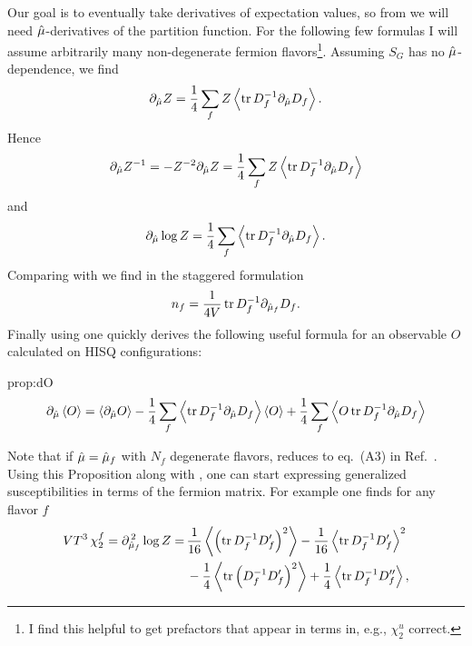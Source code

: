 Our goal is to eventually take derivatives of expectation values, so from
 we will need $\hat{\mu}$-derivatives of the partition 
function. For the following few formulas 
I will assume arbitrarily many non-degenerate
fermion flavors\footnote{I find this helpful to get prefactors that appear
in terms in, e.g., $\chi_2^u$ correct.}. Assuming $S_G$ has no 
$\hat{\mu}$-dependence, we find
\begin{equation}
  \partial_{\muh}Z = \frac{1}{4}\sum_f 
                      Z\ev{\tr D_f^{-1}\partial_{\muh}D_f}.
\end{equation}
Hence 
\begin{equation}\label{eq:dZinv}
  \partial_{\muh}Z^{-1} = -Z^{-2}\partial_{\muh}Z
                        =\frac{1}{4}\sum_fZ\ev{\tr D_f^{-1}\partial_{\muh}D_f}
\end{equation}
and
\begin{equation}\label{eq:dlogZ}
  \partial_{\muh}\log Z=\frac{1}{4}\sum_f\ev{\tr D_f^{-1}\partial_{\muh}D_f}.
\end{equation}
Comparing  with  we find in
the staggered formulation
\begin{equation}
  n_f=\frac{1}{4V}\tr D_f^{-1}\partial_{\hat{\mu}_f}D_f.
\end{equation} 
Finally using  one quickly derives the following useful formula
for an observable $O$ calculated on HISQ configurations:
\begin{proposition}{}{prop:dO}
\begin{equation*} \partial_{\muh}\ev{O}
       =   \ev{\partial_{\muh}O}
        -\frac{1}{4}\sum_f\ev{\tr D_f^{-1}\partial_{\muh}D_f}\ev{O}
         +\frac{1}{4}\sum_f\ev{O\tr D_f^{-1}\partial_{\muh}D_f}
\end{equation*}
\end{proposition} 
Note that if $\hat{\mu}=\hat{\mu}_f$ with $N_f$ degenerate flavors, 
 reduces to eq.~(A3)
in Ref.~\cite{allton_thermodynamics_2005}. Using this Proposition along
with , one 
can start expressing generalized susceptibilities in terms of the fermion
matrix. For example one finds for any flavor $f$
\begin{equation}\begin{aligned}
  VT^3\,\chi_2^f =\partial_{\muh_f}^{\,2}\log Z
                 =\, & \frac{1}{16}\ev{\left(\tr D_f^{-1}D_f'\right)^2}
                    -\frac{1}{16}\ev{\tr D_f^{-1}D_f'}^2\\
                   & -\frac{1}{4}\ev{\tr \left(D_f^{-1} D_f'\right)^2}
                    +\frac{1}{4}\ev{\tr D_f^{-1}D_f''},
\end{aligned}\end{equation}
